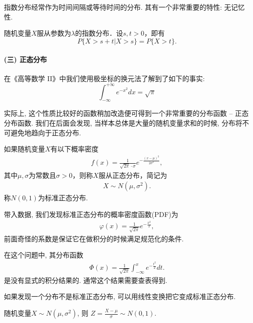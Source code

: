 指数分布经常作为时间间隔或等待时间的分布. 其有一个非常重要的特性: 无记忆性.

\begin{proposition}[指数分布的无记忆性]
    随机变量$X$服从参数为$\lambda$的指数分布．设$s,t>0$，即有
    \[ P\{X>s+t|X>s\}=P\{X>t\}.\]
\end{proposition}

\paragraph{(三) 正态分布}

在《高等数学 II》中我们使用极坐标的换元法了解到了如下的事实:
$$
    \int_{-\infty}^{+\infty}e^{-x^2} dx =\sqrt \pi
$$

实际上, 这个性质比较好的函数稍加改造便可得到一个非常重要的分布函数 --
正态分布函数. 我们在后面会发现, 当样本总体是大量的随机变量求和的时候,
分布将不可避免地趋向于正态分布.

\begin{definition}
    如果随机变量$X$有以下概率密度
    \begin{align*}
        f(x)=\frac1{\sqrt{2\pi}\cdot\sigma}e^{-\frac{(x-\mu)^2}{2\sigma^2}},
    \end{align*}
    其中$\mu,\sigma$为常数且$\sigma>0$，则称$X$服从正态分布，简记为%
    \begin{align*}
        X \sim N(\mu,\sigma^2).
    \end{align*}
    称$N(0,1)$为标准正态分布.
\end{definition}

带入数据, 我们发现标准正态分布的概率密度函数(PDF)为
\begin{align*}
    \varphi(x)=\frac1{\sqrt{2\pi}}e^{-\frac{x^2}{2}},
\end{align*}
前面奇怪的系数是保证它在做积分的时候满足规范化的条件.

在这个问题中, 其分布函数
\begin{align*}
    \Phi(x)=\frac1{\sqrt{2\pi}}\int_{-\infty}^xe^{-\frac{t^2}{2}}dt.
\end{align*}
是没有显式的积分结果的. 通常这个结果需要查表得到.

如果发现一个分布不是标准正态分布, 可以用线性变换把它变成标准正态分布.

\begin{proposition}
    随机变量$X\sim N(\mu,\sigma^2)$, 则 $Z=\frac{X-\mu}{\sigma}\sim N(0,1)$.
\end{proposition}

